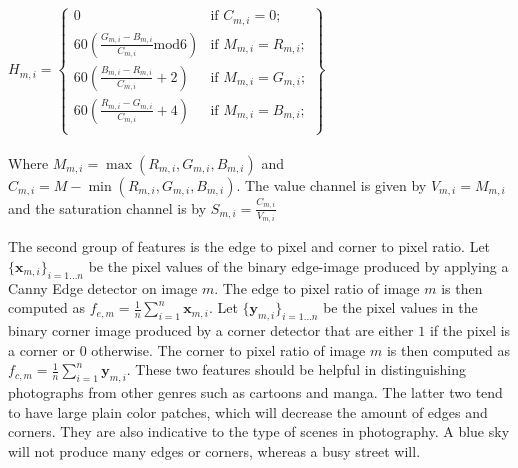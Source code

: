 $H_{m,i} = \left\{ 
\begin{array}{ll}
0 & \mbox{if $C_{m,i} = 0$};\\
60 \left(\frac{G_{m,i}-B_{m,i}}{C_{m,i}} \mbox{mod} 6 \right) & \mbox{if $M_{m,i} = R_{m,i}$};\\
60 \left(\frac{B_{m,i}-R_{m,i}}{C_{m,i}} + 2 \right) & \mbox{if $M_{m,i} = G_{m,i}$};\\
60 \left(\frac{R_{m,i}-G_{m,i}}{C_{m,i}} + 4 \right) & \mbox{if $M_{m,i} = B_{m,i}$}; \\
\end{array}
\right\}$\\\\

Where $M_{m,i} = \max(R_{m,i},G_{m,i},B_{m,i})$ and $C_{m,i} =  M - \min(R_{m,i},G_{m,i},B_{m,i})$. The value channel is given by $V_{m,i} =  M_{m,i}$ and the saturation channel is  by $S_{m,i} = \frac{C_{m,i}}{V_{m,i}}$

The second group of features is the edge to pixel and corner to pixel ratio. Let $\{\mathbf{x}_{m,i} \}_{i=1\dots n}$ be the pixel values of the binary edge-image produced by applying a Canny Edge detector \cite{cannyEdge} on image $m$. The edge to pixel ratio of image $m$ is then computed as $f_{e,m} = \frac{1}{n}\sum_{i=1}^{n} \mathbf{x}_{m,i} $. Let $\{\mathbf{y}_{m,i} \}_{i=1\dots n}$ be the pixel values in the binary corner image produced by a corner detector that are either $1$ if the pixel is a corner or $0$ otherwise. The corner to pixel ratio of image $m$ is then computed as  $f_{c,m} = \frac{1}{n}\sum_{i=1}^{n} \mathbf{y}_{m,i} $. These two features should be helpful in distinguishing photographs from other genres such as cartoons and manga. The latter two tend to have large plain color patches, which will decrease the amount of edges and corners. They are also indicative to the type of scenes in photography. A blue sky will not produce many edges or corners, whereas a busy street will.  

